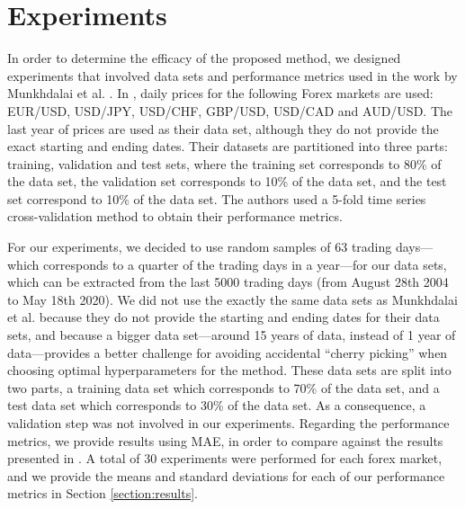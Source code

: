 ﻿\documentclass{ieeeaccess}
\begin{document}
\section{Experiments}
\label{section:experiments}

In order to determine the efficacy of the proposed method, we designed
experiments that involved data sets and performance metrics used in
the work by Munkhdalai et al. \cite{Munkhdalai2019}. In
\cite{Munkhdalai2019}, daily prices for the following Forex markets
are used: EUR/USD, USD/JPY, USD/CHF, GBP/USD, USD/CAD and AUD/USD. The last
year of prices are used as their data set, although they do not
provide the exact starting and ending dates. Their datasets are
partitioned into three parts: training, validation and test sets,
where the training set corresponds to 80\% of the data set, the
validation set corresponds to 10\% of the data set, and the test set
correspond to 10\% of the data set. The authors used a 5-fold time
series cross-validation method to obtain their performance metrics.

For our experiments, we decided to use random samples of 63 trading
days---which corresponds to a quarter of the trading days in a
year---for our data sets, which can be extracted from the last 5000
trading days (from August 28th 2004 to May 18th 2020). We did not use
the exactly the same data sets as Munkhdalai et al. because they do
not provide the starting and ending dates for their data sets, and
because a bigger data set---around 15 years of data, instead of 1 year
of data---provides a better challenge for avoiding accidental ``cherry
picking'' \cite{morse2010cherry} when choosing optimal hyperparameters
for the method. %
These data sets
are split into two parts, a training data set which corresponds to
70\% of the data set, and a test data set which corresponds to 30\% of
the data set. As a consequence, a validation step was not involved in
our experiments. Regarding the performance metrics, we provide results
using MAE, in order to compare against the results presented
in \cite{Munkhdalai2019}. A total
of 30 experiments were performed for each forex market, and we provide
the means and standard deviations for each of our performance metrics
in Section \ref{section:results}.
\end{document}
